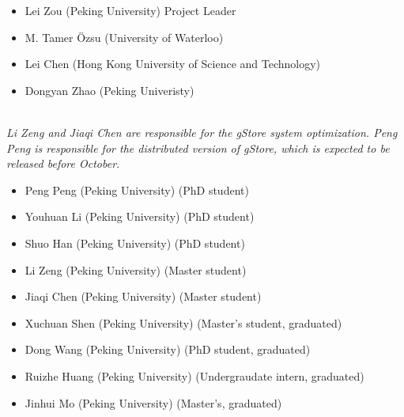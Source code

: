 \documentclass[titlepage, a4paper, 12pt]{article}
\begin{document}
\begin{itemize}
\item
  Lei Zou (Peking University) Project Leader
\item
  M. Tamer {\"O}zsu (University of Waterloo)
\item
  Lei Chen (Hong Kong University of Science and Technology)
\item
  Dongyan Zhao (Peking Univeristy)
\end{itemize}


\quad \\

\textit{Li Zeng and Jiaqi Chen are responsible for the gStore system optimization. Peng Peng is responsible for the distributed version of gStore, which is expected to be released before October.}

\begin{itemize}
\item
  Peng Peng (Peking University) (PhD student)
\item
  Youhuan Li (Peking University) (PhD student)
\item
  Shuo Han (Peking University) (PhD student)
\item
  Li Zeng (Peking University) (Master student)
\item
  Jiaqi Chen (Peking University) (Master student)
\end{itemize}


\begin{itemize}
\item
  Xuchuan Shen (Peking University) (Master's student, graduated)
\item
  Dong Wang (Peking University) (PhD student, graduated)
\item
  Ruizhe Huang (Peking University) (Undergraudate intern, graduated)
\item
  Jinhui Mo (Peking University) (Master's, graduated)
\end{itemize}
\end{document}
